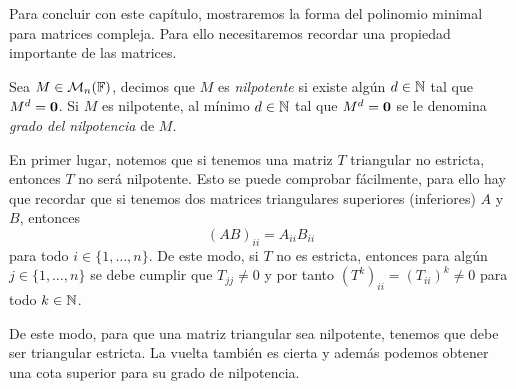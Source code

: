 Para concluir con este capítulo, mostraremos la forma del polinomio minimal para matrices compleja. Para ello necesitaremos recordar una propiedad importante de las matrices.

\begin{defi}
  Sea $M \in \mathcal{M}_n(\mathbb{F})$, decimos que $M$ es \emph{nilpotente} si existe algún $d\in\mathbb{N}$ tal que $M^d = \mathbf{0}$. Si $M$ es nilpotente, al mínimo $d \in \mathbb{N}$ tal que $M^d = \mathbf{0}$ se le denomina \emph{grado del nilpotencia} de $M$.
\end{defi}

En primer lugar, notemos que si tenemos una matriz $T$ triangular no estricta, entonces $T$ no será nilpotente. Esto se puede comprobar fácilmente, para ello hay que recordar que si tenemos dos matrices triangulares superiores (inferiores) $A$ y $B$, entonces
  \[
    (AB)_{ii} = A_{ii} B_{ii}
  \]
para todo $i \in \{1,\ldots,n\}$. De este modo, si $T$ no es estricta, entonces para algún $j \in \{1,\ldots,n\}$ se debe cumplir que $T_{jj} \neq 0$ y por tanto $(T^k)_{ii} = (T_{ii})^k \neq 0$ para todo $k \in \mathbb{N}$.

De este modo, para que una matriz triangular sea nilpotente, tenemos que debe ser triangular estricta. La vuelta también es cierta y además podemos obtener una cota superior para su grado de nilpotencia.

